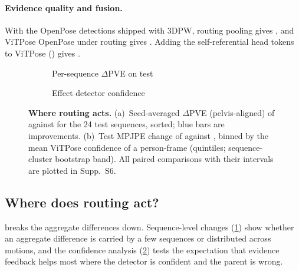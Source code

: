 \paragraph{Evidence quality and fusion.}
With the OpenPose detections shipped with 3DPW, routing \vs pooling gives , and ViTPose \vs OpenPose under routing gives .
Adding the self-referential head tokens to ViTPose () gives .

\begin{figure}[t]
  \centering
  \begin{subfigure}[t]{0.48\textwidth}\centering
    \caption{Per-sequence $\Delta$PVE on test}\label{fig:data:sequences}
  \end{subfigure}\hfill
  \begin{subfigure}[t]{0.48\textwidth}\centering
    \caption{Effect \vs detector confidence}\label{fig:data:confidence}
  \end{subfigure}
  \caption{\textbf{Where routing acts.}
  (a)~Seed-averaged $\Delta$PVE (pelvis-aligned) of  against  for the 24 test sequences, sorted; blue bars are improvements.
  (b)~Test MPJPE change of  against , binned by the mean ViTPose confidence of a person-frame (quintiles; sequence-cluster bootstrap band).
  All paired comparisons with their intervals are plotted in Supp.~S6.}
  \label{fig:data}
\end{figure}

\subsection{Where does routing act?}
\label{sec:where}

 breaks the aggregate differences down.
Sequence-level changes (\cref{fig:data:sequences}) show whether an aggregate difference is carried by a few sequences or distributed across motions, and the confidence analysis (\cref{fig:data:confidence}) tests the expectation that evidence feedback helps most where the detector is confident and the parent is wrong.

